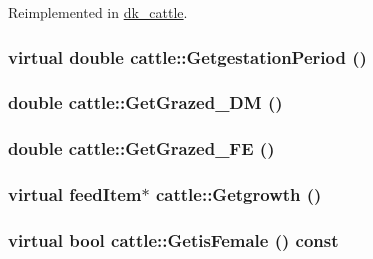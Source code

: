 Reimplemented in \hyperlink{classdk__cattle_a360aab1d0df345d99791e00292999a94}{dk\_\-cattle}.\hypertarget{classcattle_a7bda83b3832babf60809ada5e9e785ab}{
\subsubsection[{GetgestationPeriod}]{\setlength{\rightskip}{0pt plus 5cm}virtual double cattle::GetgestationPeriod ()}}
\label{classcattle_a7bda83b3832babf60809ada5e9e785ab}
\hypertarget{classcattle_ad3bde990fd7b51e67af6ba7c202f6235}{
\subsubsection[{GetGrazed\_\-DM}]{\setlength{\rightskip}{0pt plus 5cm}double cattle::GetGrazed\_\-DM ()}}
\label{classcattle_ad3bde990fd7b51e67af6ba7c202f6235}
\hypertarget{classcattle_ad841e565dad1037d1ad59967d7d70600}{
\subsubsection[{GetGrazed\_\-FE}]{\setlength{\rightskip}{0pt plus 5cm}double cattle::GetGrazed\_\-FE ()}}
\label{classcattle_ad841e565dad1037d1ad59967d7d70600}
\hypertarget{classcattle_a31cf342857dea26371d0da77baec3b99}{
\subsubsection[{Getgrowth}]{\setlength{\rightskip}{0pt plus 5cm}virtual {\bf feedItem}$\ast$ cattle::Getgrowth ()}}
\label{classcattle_a31cf342857dea26371d0da77baec3b99}
\hypertarget{classcattle_a1f53f6f6b44193909bd6524df7c90169}{
\subsubsection[{GetisFemale}]{\setlength{\rightskip}{0pt plus 5cm}virtual bool cattle::GetisFemale () const}}
